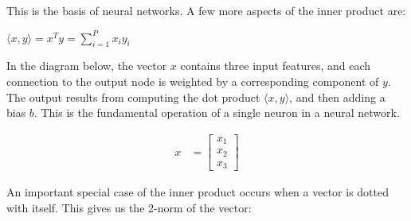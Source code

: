 This is the basis of neural networks. A few more aspects of the inner product are:

\vspace{0.8em} 

$\langle x,y \rangle = x^T y = \sum_{i=1}^{P}x_i y_i$

\vspace{1em} 

In the diagram below, the vector $x$ contains three input features, and each connection
to the output node is weighted by a corresponding component of $y$. The output results from computing the dot product $\langle x, y \rangle$, and then adding a bias $b$. 
This is the fundamental operation of a single neuron in a neural network.


\begin{center}
	\begin{minipage}[c]{0.35\textwidth}
		\begin{align*}
			x &= \begin{bmatrix} x_1 \\ x_2 \\ x_3 \end{bmatrix}
		\end{align*}
	\end{minipage}
	\hfill
	\begin{minipage}[c]{0.6\textwidth}
	\end{minipage}
\end{center}

An important special case of the inner product occurs when a vector is dotted 
with itself. This gives us the 2-norm of the vector:

